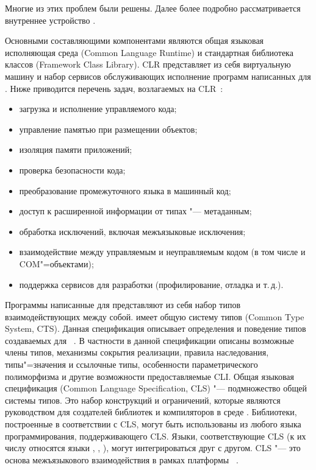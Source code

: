 Многие из этих проблем были решены.
Далее более подробно рассматривается внутреннее устройство \dotnet{}.

Основными составляющими компонентами \dotnet{} являются общая языковая исполняющая среда (Common Language Runtime) и стандартная библиотека классов (Framework Class Library).
CLR представляет из себя виртуальную машину и набор сервисов обслуживающих исполнение программ написанных для \dotnet{}.
Ниже приводится перечень задач, возлагаемых на CLR~\cite{marchenko_2007}:
\begin{itemize}
  \item загрузка и исполнение управляемого кода;
  \item управление памятью при размещении объектов;
  \item изоляция памяти приложений;
  \item проверка безопасности кода;
  \item преобразование промежуточного языка в машинный код;
  \item доступ к расширенной информации от типах "--- метаданным;
  \item обработка исключений, включая межъязыковые исключения;
  \item взаимодействие между управляемым и неуправляемым кодом (в том числе и COM"=объектами);
  \item поддержка сервисов для разработки (профилирование, отладка и т.\,д.).
\end{itemize}

Программы написанные для \dotnet{} представляют из себя набор типов взаимодействующих между собой.
\dotnet{} имеет общую систему типов (Common Type System, CTS).
Данная спецификация описывает определения и поведение типов создаваемых для \dotnet{}~\cite{richter_2012_en}.
В частности в данной спецификации описаны возможные члены типов, механизмы сокрытия реализации, правила наследования, типы"=значения и ссылочные типы, особенности параметрического полиморфизма и другие возможности предоставляемые CLI.
Общая языковая спецификация (Common Language Specification, CLS) "--- подмножество общей системы типов. 
Это набор конструкций и ограничений, которые являются руководством для создателей библиотек и компиляторов в среде \netfx{}.
Библиотеки, построенные в соответствии с CLS, могут быть использованы из любого языка программирования, поддерживающего CLS. 
Языки, соответствующие CLS (к их числу относятся языки \csharp{}, \vbnet{}, \cppcli{}), могут интегрироваться друг с другом. CLS "--- это основа межъязыкового взаимодействия в рамках платформы \dotnet{}~\cite{marchenko_2007}.

